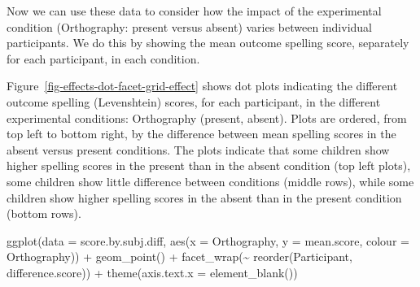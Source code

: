 \documentclass[
  letterpaper,
  DIV=11,
  numbers=noendperiod]{scrreprt}
\newenvironment{Shaded}{\begin{snugshade}}{\end{snugshade}}
\newcommand{\AttributeTok}[1]{\textcolor[rgb]{0.40,0.45,0.13}{#1}}
\newcommand{\FunctionTok}[1]{\textcolor[rgb]{0.28,0.35,0.67}{#1}}
\newcommand{\NormalTok}[1]{\textcolor[rgb]{0.00,0.23,0.31}{#1}}
\newcommand{\SpecialCharTok}[1]{\textcolor[rgb]{0.37,0.37,0.37}{#1}}
\begin{document}
Now we can use these data to consider how the impact of the experimental
condition (Orthography: present versus absent) varies between individual
participants. We do this by showing the mean outcome spelling score,
separately for each participant, in each condition.

Figure~\ref{fig-effects-dot-facet-grid-effect} shows dot plots
indicating the different outcome spelling (Levenshtein) scores, for each
participant, in the different experimental conditions: Orthography
(present, absent). Plots are ordered, from top left to bottom right, by
the difference between mean spelling scores in the absent versus present
conditions. The plots indicate that some children show higher spelling
scores in the present than in the absent condition (top left plots),
some children show little difference between conditions (middle rows),
while some children show higher spelling scores in the absent than in
the present condition (bottom rows).

\begin{Shaded}
\begin{Highlighting}[numbers=left,,]
\FunctionTok{ggplot}\NormalTok{(}\AttributeTok{data =}\NormalTok{ score.by.subj.diff, }
       \FunctionTok{aes}\NormalTok{(}\AttributeTok{x =}\NormalTok{ Orthography, }\AttributeTok{y =}\NormalTok{ mean.score,}
           \AttributeTok{colour =}\NormalTok{ Orthography)) }\SpecialCharTok{+}
  \FunctionTok{geom\_point}\NormalTok{() }\SpecialCharTok{+}
  \FunctionTok{facet\_wrap}\NormalTok{(}\SpecialCharTok{\textasciitilde{}} \FunctionTok{reorder}\NormalTok{(Participant, difference.score)) }\SpecialCharTok{+}
  \FunctionTok{theme}\NormalTok{(}\AttributeTok{axis.text.x =} \FunctionTok{element\_blank}\NormalTok{())}
\end{Highlighting}
\end{Shaded}
\end{document}
